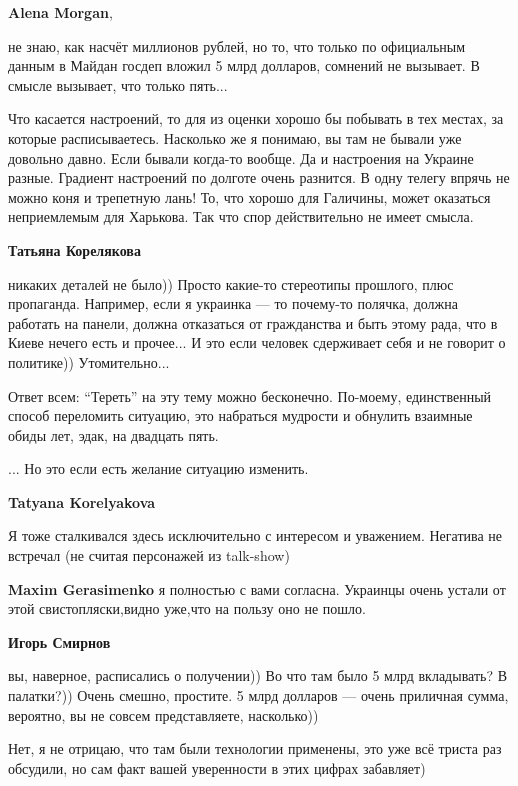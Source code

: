 \begin{itemize}
\begin{itemize}
\textbf{Alena Morgan}, 

не знаю, как насчёт миллионов рублей, но то, что только по официальным данным в
Майдан госдеп вложил 5 млрд долларов, сомнений не вызывает. В смысле вызывает,
что только пять...

Что касается настроений, то для из оценки хорошо бы побывать в тех местах, за
которые расписываетесь. Насколько же я понимаю, вы там не бывали уже довольно
давно. Если бывали когда-то вообще. Да и настроения на Украине разные. Градиент
настроений по долготе очень разнится. В одну телегу впрячь не можно коня и
трепетную лань! То, что хорошо для Галичины, может оказаться неприемлемым для
Харькова. Так что спор действительно не имеет смысла.

\textbf{Татьяна Корелякова} 

никаких деталей не было)) Просто какие-то стереотипы прошлого, плюс пропаганда.
Например, если я украинка — то почему-то полячка, должна работать на панели,
должна отказаться от гражданства и быть этому рада, что в Киеве нечего есть и
прочее... И это если человек сдерживает себя и не говорит о политике))
Утомительно...


Ответ всем: \enquote{Тереть} на эту тему можно бесконечно. По-моему, единственный
способ переломить ситуацию, это набраться мудрости и обнулить взаимные обиды
лет, эдак, на двадцать пять.

... Но это если есть желание ситуацию изменить.

\textbf{Tatyana Korelyakova} 

Я тоже сталкивался здесь исключительно с интересом и уважением. Негатива не
встречал (не считая персонажей из talk-show)

\textbf{Maxim Gerasimenko} я полностью с вами согласна. Украинцы очень устали от этой свистопляски,видно уже,что на пользу оно не пошло.

\textbf{Игорь Смирнов} 

вы, наверное, расписались о получении)) Во что там было 5 млрд вкладывать? В
палатки?)) Очень смешно, простите. 5 млрд долларов — очень приличная сумма,
вероятно, вы не совсем представляете, насколько))

Нет, я не отрицаю, что там были технологии применены, это уже всё триста раз
обсудили, но сам факт вашей уверенности в этих цифрах забавляет)



\end{itemize}
\end{itemize}
